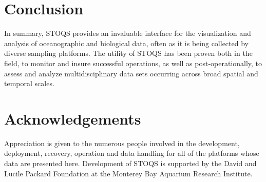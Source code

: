 \documentclass[conference]{IEEEtran}
\begin{document}
\section{Conclusion}
In summary, STOQS provides an invaluable interface for the visualization and analysis of oceanographic and biological data, often as it is being collected by diverse sampling platforms.  The utility of STOQS has been proven both in the field, to monitor and insure successful operations, as well as post-operationally, to assess and analyze multidisciplinary data sets occurring across broad spatial and temporal scales.






\section*{Acknowledgements}

Appreciation is given to the numerous people involved in the development, deployment, recovery, operation and data handling for all of the platforms whose data are presented here. Development of STOQS is supported by the David and Lucile Packard Foundation at the Monterey Bay Aquarium Research Institute.








%




\end{document}

